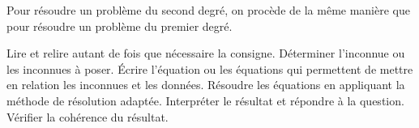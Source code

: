 \documentclass[a4paper,12pt]{report}
\begin{document}
Pour résoudre un problème du second degré, on procède de la même manière que pour résoudre un problème du premier degré.
\begin{tasks}
	\task Lire et relire autant de fois que nécessaire la consigne.
	\task Déterminer l'inconnue ou les inconnues à poser.
	\task Écrire l'équation ou les équations qui permettent de mettre en relation les inconnues et les données.
	\task Résoudre les équations en appliquant la méthode de résolution adaptée.
	\task Interpréter le résultat et répondre à la question.
	\task Vérifier la cohérence du résultat.
\end{tasks}

\begin{boiteExT}

	\vspace{17cm}	

\end{boiteExT}
\end{document}

